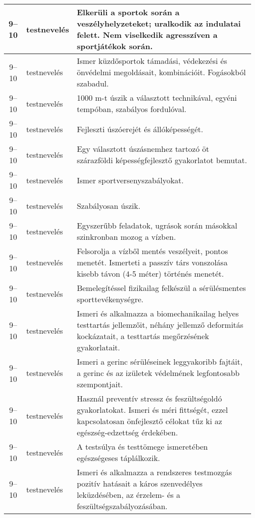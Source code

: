 \begin{small}
\begin{longtable}{c | p{2cm} |  p{11cm} }
              9--10 & testnevelés & Elkerüli a sportok során a veszélyhelyzeteket; uralkodik az indulatai felett. Nem viselkedik agresszíven a sportjátékok során. \\ \hline
              9--10 & testnevelés & Ismer küzdősportok támadási, védekezési és önvédelmi megoldásait, kombinációit. Fogásokból szabadul. \\ \hline
              9--10 & testnevelés & 1000 m-t  úszik a választott technikával, egyéni tempóban, szabályos fordulóval. \\ \hline
              9--10 & testnevelés & Fejleszti úszóerejét és állóképességét. \\ \hline
              9--10 & testnevelés & Egy választott úszásnemhez tartozó öt szárazföldi képességfejlesztő gyakorlatot bemutat. \\ \hline
              9--10 & testnevelés & Ismer sportversenyszabályokat. \\ \hline
              9--10 & testnevelés & Szabályosan úszik. \\ \hline
              9--10 & testnevelés & Egyszerűbb feladatok, ugrások során másokkal szinkronban mozog a vízben. \\ \hline
              9--10 & testnevelés & Felsorolja a vízből mentés veszélyeit, pontos menetét. Ismerteti a passzív társ vonszolása kisebb távon (4-5 méter) történés menetét. \\ \hline
              9--10 & testnevelés & Bemelegítéssel fizikailag felkészül a sérülésmentes sporttevékenységre. \\ \hline
              9--10 & testnevelés & Ismeri és alkalmazza a biomechanikailag helyes testtartás jellemzőit, néhány jellemző deformitás kockázatait, a testtartás megőrzésének gyakorlatait. \\ \hline
              9--10 & testnevelés & Ismeri a gerinc sérüléseinek leggyakoribb fajtáit, a gerinc és az izületek védelmének legfontosabb szempontjait. \\ \hline
              9--10 & testnevelés & Használ preventív stressz és feszültségoldó gyakorlatokat. Ismeri és méri fittségét, ezzel kapcsolatosan önfejlesztő célokat tűz ki az egészség-edzettség érdekében. \\ \hline
              9--10 & testnevelés & A testsúlya és testtömege ismeretében egészségeses táplálkozik. \\ \hline
              9--10 & testnevelés & Ismeri és alkalmazza a rendszeres testmozgás pozitív hatásait a káros szenvedélyes leküzdésében, az érzelem- és a feszültségszabályozásában. \\ \hline

\end{longtable}
\end{small}
